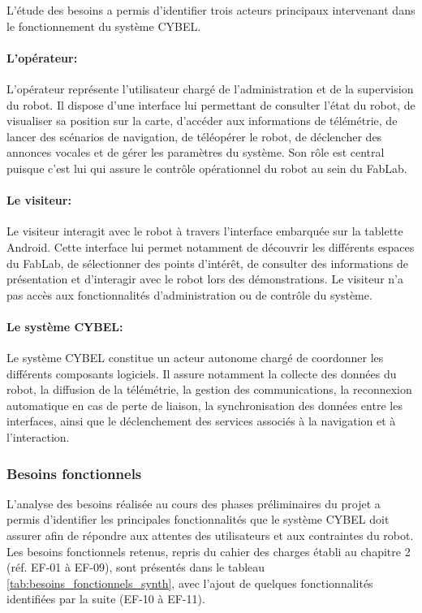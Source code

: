 L'étude des besoins a permis d'identifier trois acteurs principaux
intervenant dans le fonctionnement du système CYBEL.

\paragraph{L'opérateur:}
L'opérateur représente l'utilisateur chargé de l'administration et de la
supervision du robot. Il dispose d'une interface lui permettant de
consulter l'état du robot, de visualiser sa position sur la carte,
d'accéder aux informations de télémétrie, de lancer des scénarios de
navigation, de téléopérer le robot, de déclencher des annonces vocales et
de gérer les paramètres du système. Son rôle est central puisque c'est lui
qui assure le contrôle opérationnel du robot au sein du FabLab.

\paragraph{Le visiteur:}
Le visiteur interagit avec le robot à travers l'interface embarquée sur la
tablette Android. Cette interface lui permet notamment de découvrir les
différents espaces du FabLab, de sélectionner des points d'intérêt, de
consulter des informations de présentation et d'interagir avec le robot
lors des démonstrations. Le visiteur n'a pas accès aux fonctionnalités
d'administration ou de contrôle du système.

\paragraph{Le système CYBEL:}
Le système CYBEL constitue un acteur autonome chargé de coordonner les
différents composants logiciels. Il assure notamment la collecte des
données du robot, la diffusion de la télémétrie, la gestion des
communications, la reconnexion automatique en cas de perte de liaison, la
synchronisation des données entre les interfaces, ainsi que le
déclenchement des services associés à la navigation et à l'interaction.

\subsubsection{Besoins fonctionnels}

L'analyse des besoins réalisée au cours des phases préliminaires du projet a
permis d'identifier les principales fonctionnalités que le système CYBEL doit
assurer afin de répondre aux attentes des utilisateurs et aux contraintes du
robot. Les besoins fonctionnels retenus, repris du cahier des charges établi
au chapitre 2 (réf. EF-01 à EF-09), sont présentés dans le tableau
\ref{tab:besoins_fonctionnels_synth}, avec l'ajout de quelques fonctionnalités
identifiées par la suite (EF-10 à EF-11).

